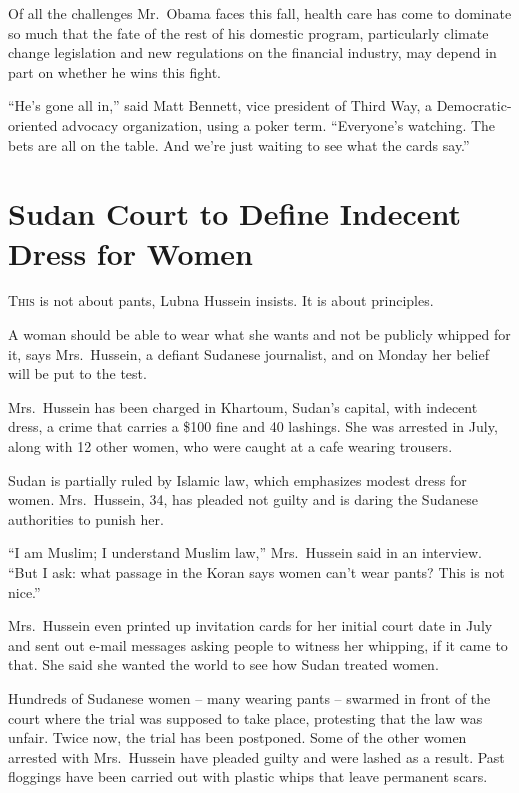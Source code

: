 ﻿\documentclass[12pt]{article}
\begin{document}
Of all the challenges Mr.~Obama faces this fall, health care has come to dominate so much that the
fate of the rest of his domestic program, particularly climate change legislation and new
regulations on the financial industry, may depend in part on whether he wins this fight.

``He's gone all in,'' said Matt Bennett, vice president of Third Way, a Democratic-oriented advocacy
organization, using a poker term. ``Everyone's watching. The bets are all on the table. And we're
just waiting to see what the cards say.''

\section{Sudan Court to Define Indecent Dress for Women}

\lettrine{T}{his} is not about pants, Lubna Hussein insists. It is about principles.

A woman should be able to wear what she wants and not be publicly whipped for it, says Mrs.~Hussein,
a defiant Sudanese journalist, and on Monday her belief will be put to the test.

Mrs.~Hussein has been charged in Khartoum, Sudan's capital, with indecent dress, a crime that
carries a \$100 fine and 40 lashings. She was arrested in July, along with 12 other women, who were
caught at a cafe wearing trousers.

Sudan is partially ruled by Islamic law, which emphasizes modest dress for women. Mrs.~Hussein, 34,
has pleaded not guilty and is daring the Sudanese authorities to punish her.

``I am Muslim; I understand Muslim law,'' Mrs.~Hussein said in an interview. ``But I ask: what
passage in the Koran says women can't wear pants? This is not nice.''

Mrs.~Hussein even printed up invitation cards for her initial court date in July and sent out e-mail
messages asking people to witness her whipping, if it came to that. She said she wanted the world to
see how Sudan treated women.

Hundreds of Sudanese women -- many wearing pants -- swarmed in front of the court where the trial
was supposed to take place, protesting that the law was unfair. Twice now, the trial has been
postponed. Some of the other women arrested with Mrs.~Hussein have pleaded guilty and were lashed as
a result. Past floggings have been carried out with plastic whips that leave permanent scars.
\end{document}
